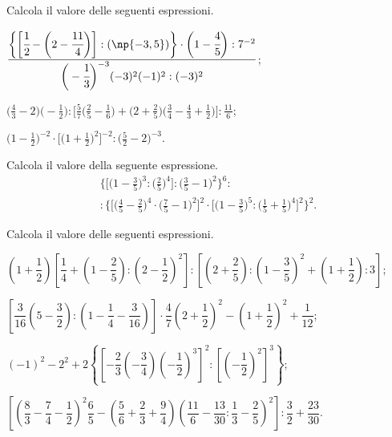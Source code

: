 \begin{esercizio}[\Ast]%
 Calcola il valore delle seguenti espressioni.
\begin{enumeratea}
\spazielenx
\item $\displaystyle{\frac{\bigg\{\bigg[\cfrac{1}{2}-\bigg(2-\cfrac{11}{4}\bigg)\bigg]:(\np{-3,5})\bigg\}\cdot
\bigg(1-\cfrac{4}{5}\bigg):7^{-2}}{\bigg(-{\cfrac{1}{3}}\bigg)^{-3}(-3)^{2}(-1)^{2}:(-3)^{2}}}$;
\item $\displaystyle{\bigg(\frac{4}{3}-2\bigg)\bigg(-{\frac{1}{2}}\bigg):\bigg[\frac{5}{7}\bigg(\frac{2}{5}-\frac{1}{6}\bigg)
+\bigg(2+\frac{2}{5}\bigg)\bigg(\frac{3}{4}-\frac{4}{3}+\frac{1}{2}\bigg)\bigg]:\frac{11}{6}}$;
\item $\displaystyle{\bigg(1-\frac{1}{2}\bigg)^{-2}\cdot
\bigg[\bigg(1+\frac{1}{2}\bigg)^{2}\bigg]^{-2}:\bigg(\frac{5}{2}-2\bigg)^{-3}}$.
\end{enumeratea}
\end{esercizio}

\begin{esercizio}[\Ast]%
Calcola il valore della seguente espressione.
\begin{multline*}
 \bigg\{\bigg[\bigg(1-\frac{3}{5}\bigg)^3:\bigg(\frac{2}{5}\bigg)^{4}\bigg]:\bigg(\frac{3}{5}-1\bigg)^{2}%
\bigg\}^{6}:\\
:\bigg\{\bigg[\bigg(\frac{4}{5}-\frac{2}{5}\bigg)^{4}\cdot\bigg(\frac{7}{5}-1\bigg)^2\bigg]^{2}\cdot%
\bigg[\bigg(1-\frac{3}{5}\bigg)^{5}:\bigg(\frac{1}{5}+\frac{1}{5}\bigg)^{4}\bigg]^{2}\bigg\}^{2}.
\end{multline*}
\end{esercizio}

\begin{esercizio}[\Ast]%
 Calcola il valore delle seguenti espressioni.
\begin{enumeratea}
\spazielenx
\item $\left(1+\dfrac{1}{2}\right)\left[\dfrac{1}{4}+\left(1-\dfrac{2}{5}\right):\left(2-\dfrac{1}{2}\right)^2\right]:
\left[\left(2+\dfrac{2}{5}\right):\left(1-\dfrac{3}{5}\right)^2+\left(1+\dfrac{1}{2}\right):3\right]$;
\item $\left[\dfrac{3}{16}\left(5-\dfrac{3}{2}\right):\left(1-\dfrac{1}{4}-\dfrac{3}{16}\right)\right]\cdot \dfrac{4}{7}
\left(2+\dfrac{1}{2}\right)^2-\left(1+\dfrac{1}{2}\right)^2+\dfrac{1}{12}$;
\item $(-1)^2-2^2+2\left\lbrace\left[-\dfrac{2}{3}\left(-\dfrac{3}{4}\right)\left(-\dfrac{1}{2}\right)^3\right]^2:\left[\left(-\dfrac{1}{2}\right)^2\right]^3\right\rbrace$;
\item $\left[\left(\dfrac{8}{3}-\dfrac{7}{4}-\dfrac{1}{2}\right)^2\dfrac{6}{5}-\left(\dfrac{5}{6}+\dfrac{2}{3}+\dfrac{9}{4}\right)
\left(\dfrac{11}{6}-\dfrac{13}{30}:\dfrac{1}{3}-\dfrac{2}{5}\right)^2\right]:\dfrac{3}{2}+\dfrac{23}{30}$.
\end{enumeratea}
\end{esercizio}

